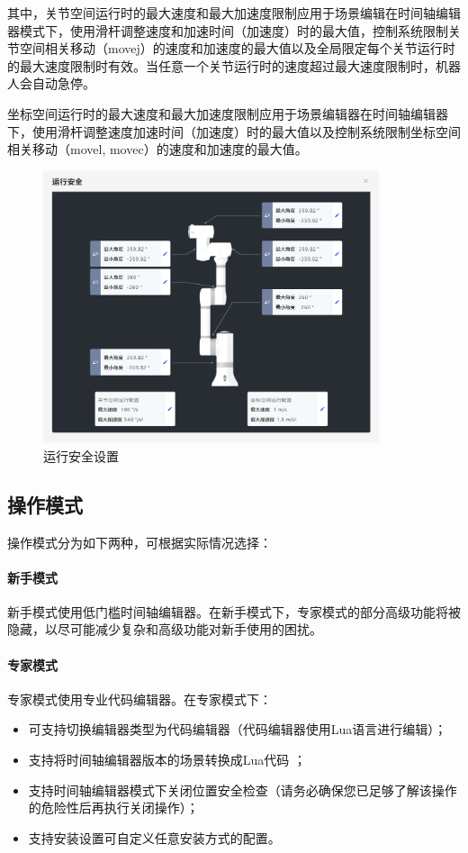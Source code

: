 其中，关节空间运行时的最大速度和最大加速度限制应用于场景编辑在时间轴编辑器模式下，使用滑杆调整速度和加速时间（加速度）时的最大值，控制系统限制关节空间相关移动（movej）的速度和加速度的最大值以及全局限定每个关节运行时的最大速度限制时有效。当任意一个关节运行时的速度超过最大速度限制时，机器人会自动急停。

坐标空间运行时的最大速度和最大加速度限制应用于场景编辑器在时间轴编辑器下，使用滑杆调整速度加速时间（加速度）时的最大值以及控制系统限制坐标空间相关移动（movel, movec）的速度和加速度的最大值。

\begin{figure}[htb!]
	\centering
	\includegraphics[height=8cm]{screen/3-27.png}
	\caption{运行安全设置}
	\label{fig:运行安全设置}
\end{figure}


\subsection{操作模式}
操作模式分为如下两种，可根据实际情况选择：
\paragraph{新手模式}
新手模式使用低门槛时间轴编辑器。在新手模式下，专家模式的部分高级功能将被隐藏，以尽可能减少复杂和高级功能对新手使用的困扰。
\paragraph{专家模式}
专家模式使用专业代码编辑器。在专家模式下：
\begin{itemize}
\item 可支持切换编辑器类型为代码编辑器（代码编辑器使用Lua语言进行编辑）；
\item 支持将时间轴编辑器版本的场景转换成Lua代码 ；
\item 支持时间轴编辑器模式下关闭位置安全检查（请务必确保您已足够了解该操作的危险性后再执行关闭操作）；
\item 支持安装设置可自定义任意安装方式的配置。
\end{itemize}


